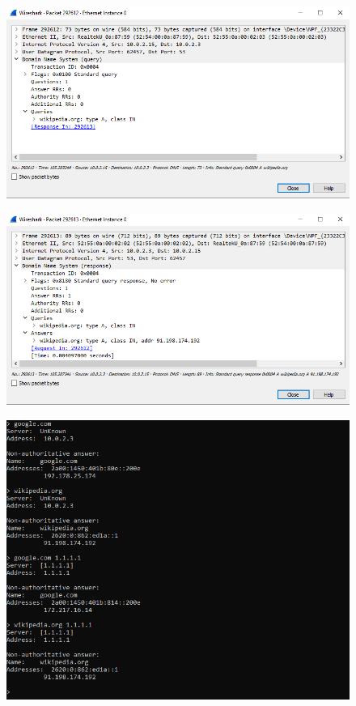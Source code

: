 \documentclass{article}
\begin{document}
\begin{normalsize}
\begin{figure}[H]
	\centering
	\includegraphics{21}
	\caption{}
\end{figure}

\begin{figure}[H]
	\centering
	\includegraphics{22}
	\caption{}
\end{figure}

\begin{figure}[H]
	\centering
	\includegraphics{31}
	\caption{}
\end{figure}


\end{normalsize}
\end{document}

